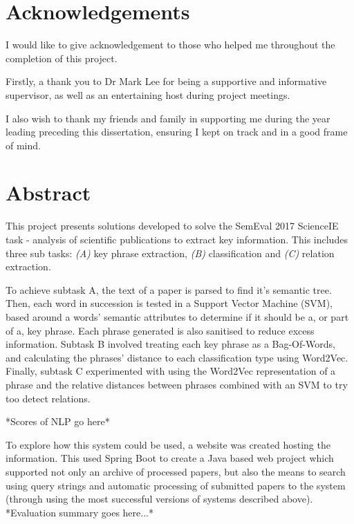 \documentclass{article}
\begin{document}
\pagebreak

\section*{Acknowledgements}
I would like to give acknowledgement to those who helped me throughout the completion of this project.\par

Firstly, a thank you to Dr Mark Lee for being a supportive and informative supervisor, as well as an entertaining host during project meetings.\par

I also wish to thank my friends and family in supporting me during the year leading preceding this dissertation, ensuring I kept on track and in a good frame of mind.\par

\pagebreak

\section*{Abstract}
This project presents solutions developed to solve the SemEval 2017 ScienceIE task - analysis of scientific publications to extract key information. This includes three sub tasks: \textit{(A)} key phrase extraction, \textit{(B)} classification and \textit{(C)} relation extraction.\par

To achieve subtask A, the text of a paper is parsed to find it's semantic tree. Then, each word in succession is tested in a Support Vector Machine (SVM), based around a words' semantic attributes to determine if it should be a, or part of a, key phrase. Each phrase generated is also sanitised to reduce excess information. Subtask B involved treating each key phrase as a Bag-Of-Words, and calculating the phrases' distance to each classification type using Word2Vec. Finally, subtask C experimented with using the Word2Vec representation of a phrase and the relative distances between phrases combined with an SVM to try too detect relations. \par

*Scores of NLP go here*\par

To explore how this system could be used, a website was created hosting the information. This used Spring Boot to create a Java based web project which supported not only an archive of processed papers, but also the means to search using query strings and automatic processing of submitted papers to the system (through using the most successful versions of systems described above).
 *Evaluation summary goes here...*\par
\end{document}
